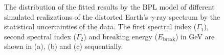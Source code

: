 \begin{figure}[h!]
    \centering
        \caption{
            The distribution of the fitted results by the BPL model
            of different simulated realizations of the distorted Earth’s
            $\gamma$-ray spectrum by the
            statistical uncertainties of the data.
            The first spectral index ($\Gamma_1$),
            second spectral index ($\Gamma_2$) and 
            breaking energy ($E_\text{break}$) in GeV
            are shown in (a), (b) and (c) sequentially.
        }
       \label{fig:monte_bpl_stat}
\end{figure}



